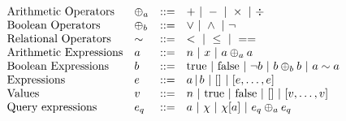{\small
\begin{figure}
\[
\begin{array}{llll}
 \mbox{Arithmetic Operators} & \oplus_a & ::= & + ~|~ - ~|~ \times 
%
~|~ \div \\  
  \mbox{Boolean Operators} & \oplus_b & ::= & \lor ~|~ \land ~|~ \neg\\
   \mbox{Relational Operators} & \sim & ::= & < ~|~ \leq ~|~ == \\  
\mbox{Arithmetic Expressions} & \aexpr & ::= & 
	n ~|~ x ~|~ \aexpr \oplus_a \aexpr  \\
\mbox{Boolean Expressions} & \bexpr & ::= & 
	\etrue ~|~ \efalse  ~|~ \neg \bexpr
	 ~|~ \bexpr \oplus_b \bexpr
	~|~ \aexpr \sim \aexpr \\
\mbox{Expressions} & \expr & ::= & \aexpr \sep \bexpr ~|~ [] ~|~ [\expr, \dots, \expr] \\	
\mbox{Values} & v & ::= & n ~|~ \etrue ~|~ \efalse ~|~ [] ~|~ [v, \dots, v] \\
\mbox{Query expressions} & \expr_q & ::= & \aexpr ~|~ \chi ~|~ \chi[\aexpr] ~|~ \expr_q \oplus_a \expr_q \\

\end{array}\]
\end{figure}}
